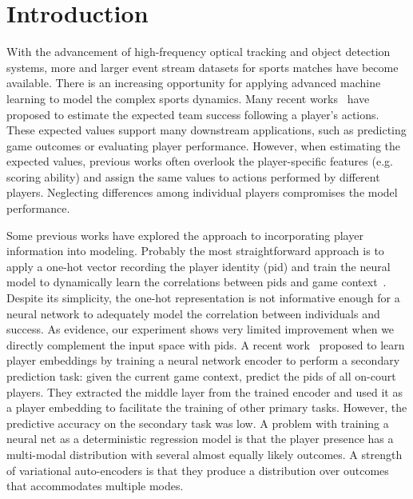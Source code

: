 \documentclass[letterpaper]{article} %
\begin{document}
\section{Introduction}
With the advancement of high-frequency optical tracking and object detection systems, more and larger event stream datasets for sports matches have become available. 
There is an increasing opportunity for applying advanced machine learning to model the complex sports dynamics.
Many recent works~\cite{Liu2018,decroos2018action,fernandez2019decomposing} have proposed to estimate the expected team success following a player's actions. These expected values support many downstream applications, such as predicting game outcomes or evaluating player performance. However, when estimating the expected values, previous works often overlook the player-specific features (e.g. scoring ability) and assign the same values to actions performed by different players. Neglecting differences among individual players compromises the model performance.

Some previous works have explored the approach to incorporating player information into modeling.
Probably the most straightforward approach is to apply a one-hot vector recording the player identity (pid) and train the neural model to dynamically learn the correlations between pids and game context~\cite{Le2017}.
Despite its simplicity, the one-hot representation is not informative enough for a neural network to adequately model the correlation between individuals and success. 
As evidence, our experiment shows very limited improvement when we directly complement the input space with pids.
A recent work~\cite{ganguly2018problem} proposed to learn player embeddings by training a neural network encoder to perform a secondary prediction task:
given the current game context, predict the pids of all on-court players.
They extracted the middle layer from the trained encoder and used it as a player embedding to facilitate the training of other primary tasks. However, the predictive accuracy on the secondary task was low. A problem with training a neural net as a deterministic regression model is that the player presence has a multi-modal distribution with several almost equally likely outcomes. A strength of variational auto-encoders is that they produce a distribution over outcomes that accommodates multiple modes. 
\end{document}
